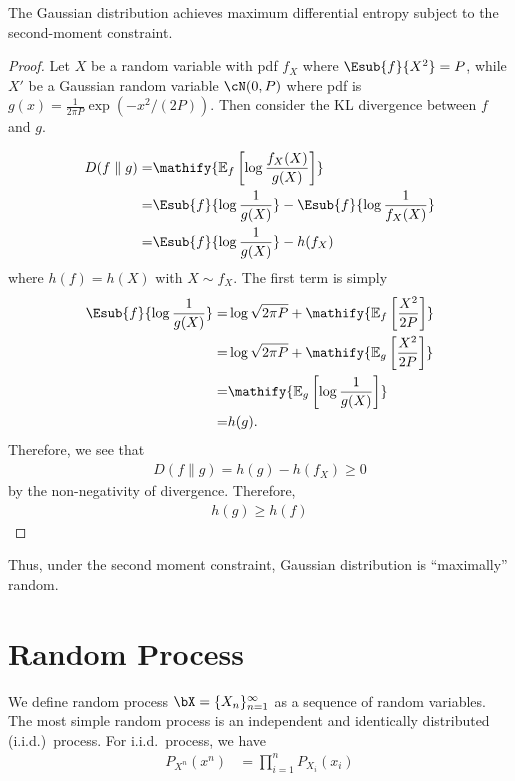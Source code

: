 \documentclass{article}
\begin{document}
\begin{theorem}
    The Gaussian distribution achieves maximum differential entropy subject to the second-moment constraint.
\end{theorem}
\begin{proof}
Let $X$ be a random variable with pdf $f_X$ where $\Esub{f}{X^2} = P$,
while $X'$ be a Gaussian random variable $\cN(0, P)$ where pdf is $g(x) = \frac{1}{2\pi P} \exp(-x^2/(2P))$.
Then consider the KL divergence between $f$ and $g$.

    \begin{align}
        D(f\parallel g)
        =& \mathify{\mathbb{E}_f\left[{\log{\frac{f_X(X)}{g(X)}}}\right]}\\
        =& \Esub{f}{\log \frac{1}{g(X)}} -  \Esub{f}{\log \frac{1}{f_X(X)}}\\
        =&\Esub{f}{\log \frac{1}{g(X)}} -h(f_X)
    \end{align}
    where $h(f) = h(X)$ with $X\sim f_X$.
    The first term is simply
    \begin{align*}
    \Esub{f}{\log \frac{1}{g(X)}} 
        =& \log{\sqrt{2\pi P}} +\mathify{\mathbb{E}_f\left[{\frac{X^2}{2P}}\right]}\\
        =& \log{\sqrt{2\pi P}} +\mathify{\mathbb{E}_g\left[{\frac{X^2}{2P}}\right]}\\
        =&\mathify{\mathbb{E}_g\left[{\log{\frac{1}{g(X)}}}\right]}\\
        =&h(g).
    \end{align*}
Therefore, we see that
\begin{align*}
    D(f\parallel g) = h(g)-h(f_X) \ge 0
\end{align*}
    by the non-negativity of divergence.
    Therefore,
\begin{align*}
     h(g) \ge h(f)
\end{align*}
\end{proof}
Thus, under the second moment constraint, Gaussian distribution is ``maximally'' random.


\newpage
\setcounter{section}{0}
\setcounter{theorem}{0}
\setcounter{equation}{0}


\section{Random Process}
We define random process $\bX = \{X_n\}_{n=1}^\infty$ as a sequence of random variables. 
The most simple random process is an independent and identically distributed (i.i.d.)~process.
For i.i.d.~process, we have
\begin{align}
    P_{X^n}(x^n) &= \prod_{i=1}^{n} P_{X_i}(x_i)
\end{align}
\end{document}
